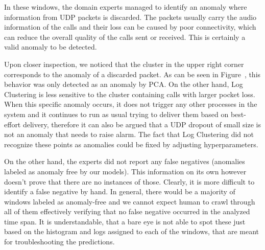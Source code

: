 In these windows, the domain experts managed to identify an anomaly where information from UDP packets is discarded. The packets usually carry the audio information of the calls and their loss can be caused by poor connectivity, which can reduce the overall quality of the calls sent or received. This is certainly a valid anomaly to be detected. 

Upon closer inspection, we noticed that the cluster in the upper right corner corresponds to the anomaly of a discarded packet. As can be seen in Figure~\label{fig:tsne-unslabeled-plots}, this behavior was only detected as an anomaly by PCA. On the other hand, Log Clustering is less sensitive to the cluster containing calls with larger pocket loss. When this specific anomaly occurs, it does not trigger any other processes in the system and it continues to run as usual trying to deliver them based on best-effort delivery, therefore it can also be argued that a UDP dropout of small size is not an anomaly that needs to raise alarm. The fact that Log Clustering did not recognize these points as anomalies could be fixed by adjusting hyperparameters.

On the other hand, the experts did not report any false negatives (anomalies labeled as anomaly free by our models). This information on its own however doesn't prove that there are no instances of those.
Clearly, it is more difficult to identify a false negative by hand. In general, there would be a majority of windows labeled as anomaly-free and we cannot expect human to crawl through all of them effectively verifying that no false negative occurred in the analyzed time span. It is understandable, that a bare eye is not able to spot these just based on the histogram and logs assigned to each of the windows, that are meant for troubleshooting the predictions.